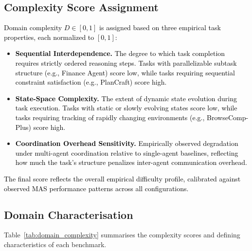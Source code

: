 \subsection{Complexity Score Assignment}

\textcolor{black}{Domain complexity $D \in [0, 1]$ is assigned based on three empirical task properties, each normalized to $[0,1]$:}

\begin{itemize}

    \item \textcolor{black}{\textbf{Sequential Interdependence.} The degree to which task completion requires strictly ordered reasoning steps. Tasks with parallelizable subtask structure (e.g., Finance Agent) score low, while tasks requiring sequential constraint satisfaction (e.g., PlanCraft) score high.}

    \item \textcolor{black}{\textbf{State-Space Complexity.} The extent of dynamic state evolution during task execution. Tasks with static or slowly evolving states score low, while tasks requiring tracking of rapidly changing environments (e.g., BrowseComp-Plus) score high.}

    \item \textcolor{black}{\textbf{Coordination Overhead Sensitivity.} Empirically observed degradation under multi-agent coordination relative to single-agent baselines, reflecting how much the task's structure penalizes inter-agent communication overhead.}
\end{itemize}

\textcolor{black}{The final score reflects the overall empirical difficulty profile, calibrated against observed MAS performance patterns across all configurations.}

\subsection{Domain Characterisation}

Table~\ref{tab:domain_complexity} summarises the complexity scores and defining characteristics of each benchmark.

